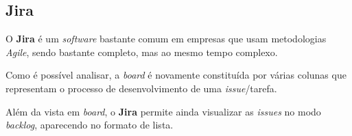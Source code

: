 \subsection{Jira}

O \textbf{Jira} é um \textit{software} bastante comum em empresas que usam metodologias \textit{Agile}, sendo bastante completo, mas ao mesmo tempo complexo.


Como é possível analisar, a \textit{board} é novamente constituída por várias colunas que representam o processo de desenvolvimento de uma \textit{issue}/tarefa.

Além da vista em \textit{board}, o \textbf{Jira} permite ainda visualizar as \textit{issues} no modo \textit{backlog}, aparecendo no formato de lista.